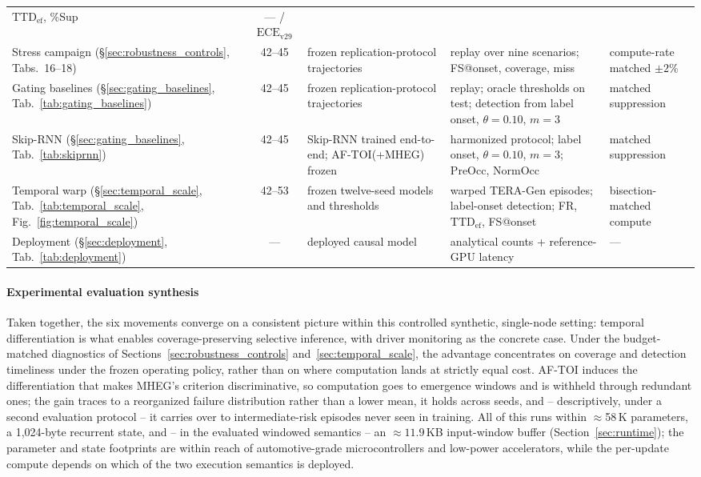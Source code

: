 \documentclass[a4paper,fleqn]{cas-dc}
\newcommand{\TERAGen}{\mbox{TERA-Gen}\xspace}
\newcommand{\AFTOI}{\mbox{AF-TOI}\xspace}
\newcommand{\MHEG}{\mbox{MHEG}\xspace}
\begin{document}
\begin{table}[!tbp]
\begin{tabularx}{\textwidth}{>{\raggedright\arraybackslash}p{2.7cm}
  c >{\raggedright\arraybackslash}p{3.0cm} >{\raggedright\arraybackslash}X
  >{\raggedright\arraybackslash}p{2.4cm}}
  $\mathrm{TTD}_{\mathrm{ef}}$, \%Sup & --- / $\mathrm{ECE}_{\mathrm{v29}}$ \\
Stress campaign (\S\ref{sec:robustness_controls},
Tabs.~16--18) & 42--45 & frozen replication-protocol trajectories
  & replay over nine scenarios; FS@onset, coverage, miss
  & compute-rate matched $\pm2\%$ \\
Gating baselines (\S\ref{sec:gating_baselines},
Tab.~\ref{tab:gating_baselines}) & 42--45 & frozen replication-protocol
  trajectories & replay; oracle thresholds on test; detection from label
  onset, $\theta{=}0.10$, $m{=}3$ & matched suppression \\
Skip-RNN (\S\ref{sec:gating_baselines}, Tab.~\ref{tab:skiprnn}) & 42--45
  & Skip-RNN trained end-to-end; \mbox{AF-TOI}(+\MHEG) frozen
  & harmonized protocol; label onset, $\theta{=}0.10$, $m{=}3$; PreOcc,
    NormOcc & matched suppression \\
Temporal warp (\S\ref{sec:temporal_scale}, Tab.~\ref{tab:temporal_scale},
Fig.~\ref{fig:temporal_scale}) & 42--53 & frozen twelve-seed models and thresholds
  & warped \TERAGen episodes; label-onset detection; FR,
    $\mathrm{TTD}_{\mathrm{ef}}$, FS@onset & bisection-matched compute \\
Deployment (\S\ref{sec:deployment}, Tab.~\ref{tab:deployment}) & ---
  & deployed causal model & analytical counts + reference-GPU latency & --- \\
\bottomrule
\end{tabularx}
\end{table}
\paragraph{Experimental evaluation synthesis}
Taken together, the six movements converge on a consistent picture within this controlled synthetic, single-node setting: temporal differentiation is what enables coverage-preserving selective inference, with driver monitoring as the concrete case. {\color{\revcolor}Under the budget-matched diagnostics of Sections~\ref{sec:robustness_controls} and~\ref{sec:temporal_scale}, the advantage concentrates on coverage and detection timeliness under the frozen operating policy, rather than on where computation lands at strictly equal cost.} \AFTOI induces the differentiation that
makes \MHEG's criterion discriminative, so computation goes to emergence windows and
is withheld through redundant ones; the gain traces to a reorganized
failure distribution rather than a lower mean, it holds across seeds, and -- descriptively, under a second evaluation
protocol -- it carries over to intermediate-risk episodes never seen in
training. All of this runs within $\approx$58\,K parameters, a 1,024-byte recurrent
state, and -- in the evaluated windowed semantics -- an ${\approx}11.9$\,KB
input-window buffer (Section~\ref{sec:runtime}); the parameter and state
footprints are within reach of automotive-grade microcontrollers and
low-power accelerators, while the per-update compute depends on which of the
two execution semantics is deployed.
\end{document}
